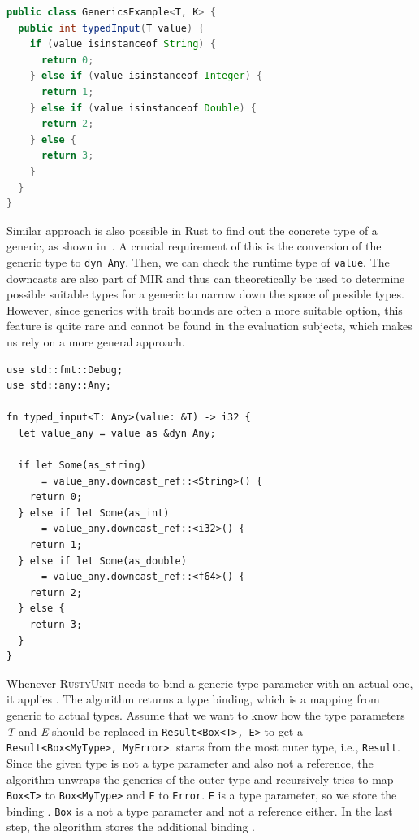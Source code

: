 \documentclass[paper=a4,%
  twoside,%
  BCOR4mm,%
  abstract=true,%
  toc=bibliography,%
  chapterprefix=true,%
  toc=bibliographynumbered,%
  open=right,%
  english,%
  pagesize=pdftex]{scrreprt}
\newcommand{\tech}{\textsc{RustyUnit}\xspace}
\newcommand{\mir}{\ac{MIR}\xspace}
\begin{document}
\begin{lstlisting}[language=Java, style=boxed, caption={The execution path of the generic Java method depends on the concrete type of the argument}, label=lst:java-isinstanceof]
public class GenericsExample<T, K> {
  public int typedInput(T value) {
    if (value isinstanceof String) {
      return 0;
    } else if (value isinstanceof Integer) {
      return 1;
    } else if (value isinstanceof Double) {
      return 2;
    } else {
      return 3;
    }
  }
}
\end{lstlisting}

Similar approach is also possible in Rust to find out the concrete type of a generic, as shown in~. A crucial requirement of this is the conversion of the generic type to \texttt{dyn Any}. Then, we can check the runtime type of \texttt{value}. The downcasts are also part of \mir and thus can theoretically be used to determine possible suitable types for a generic to narrow down the space of possible types. However, since generics with trait bounds are often a more suitable option, this feature is quite rare and cannot be found in the evaluation subjects, which makes us rely on a more general approach. 

\begin{lstlisting}[style=boxed, caption={The execution path of the generic Rust function depends on the concrete type of the argument}, label=lst:rust-runtime-reflection]
use std::fmt::Debug;
use std::any::Any;

fn typed_input<T: Any>(value: &T) -> i32 {
  let value_any = value as &dyn Any;

  if let Some(as_string)
      = value_any.downcast_ref::<String>() {
    return 0;
  } else if let Some(as_int)
      = value_any.downcast_ref::<i32>() {
    return 1;
  } else if let Some(as_double)
      = value_any.downcast_ref::<f64>() {
    return 2;
  } else {
    return 3;
  }
}
\end{lstlisting}

Whenever \tech needs to bind a generic type parameter with an actual one, it applies . The algorithm returns a type binding, which is a mapping from generic to actual types. Assume that we want to know how the type parameters \emph{T} and \emph{E} should be replaced in \texttt{Result<Box<T>, E>} to get a \texttt{Result<Box<MyType>, MyError>}.  starts from the most outer type, i.e., \texttt{Result}. Since the given type is not a type parameter and also not a reference, the algorithm unwraps the generics of the outer type and recursively tries to map \texttt{Box<T>} to \texttt{Box<MyType>} and \texttt{E} to \texttt{Error}. \texttt{E} is a type parameter, so we store the binding \texttt{}. \texttt{Box} is a not a type parameter and not a reference either. In the last step, the algorithm stores the additional binding \texttt{}.
\end{document}
